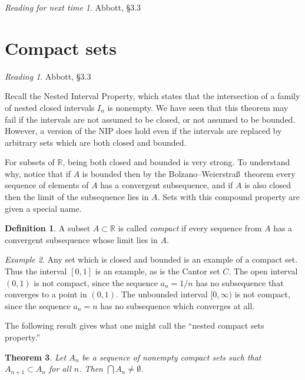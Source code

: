 \documentclass[11pt,oneside]{amsbook}
\newcommand{\R}{\mathbb R}
\theoremstyle{definition}
\theoremstyle{plain}
\newtheorem{theorem}{Theorem}[section]
\theoremstyle{definition}
\newtheorem{definition}[theorem]{Definition}
\theoremstyle{remark}
\newtheorem{example}[theorem]{Example}
\newtheorem*{reading}{Reading}
\newtheorem*{readnext}{Reading for next time}
\numberwithin{equation}{section}
\numberwithin{figure}{section}
\begin{document}

\begin{readnext}
  Abbott, \S 3.3
\end{readnext}


\newpage
\section{Compact sets}

\begin{reading}
  Abbott, \S 3.3
\end{reading}

Recall the Nested Interval Property, which states that the intersection of a family of nested closed intervals $I_n$ is nonempty. We have seen that this theorem may fail if the intervals are not assumed to be closed, or not assumed to be bounded. However, a version of the NIP does hold even if the intervals are replaced by arbitrary sets which are both closed and bounded.

For subsets of $\R$, being both closed and bounded is very strong. To understand why, notice that if $A$ is bounded then by the Bolzano--Weierstra\ss\ theorem every sequence of elements of $A$ has a convergent subsequence, and if $A$ is also closed then the limit of the subsequence lies in $A$. Sets with this compound property are given a special name.

\begin{definition}
  A subset $A\subset\R$ is called \emph{compact} if every sequence from $A$ has a convergent subsequence whose limit lies in $A$.
\end{definition}

\begin{example}
  Any set which is closed and bounded is an example of a compact set. Thus the interval $[0,1]$ is an example, as is the Cantor set $C$. The open interval $(0,1)$ is not compact, since the sequence $a_n=1/n$ has no subsequence that converges to a point in $(0,1)$. The unbounded interval $[0,\infty)$ is not compact, since the sequence $a_n=n$ has no subsequence which converges at all.
\end{example}

The following result gives what one might call the ``nested compact sets property.''

\begin{theorem}
  Let $A_n$ be a sequence of nonempty compact sets such that $A_{n+1}\subset A_n$ for all $n$. Then $\bigcap A_n\neq\emptyset$.
\end{theorem}
\end{document}
